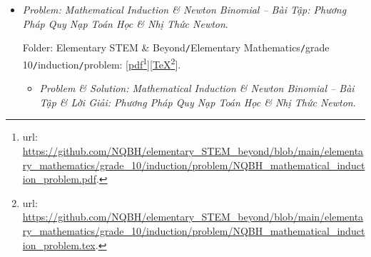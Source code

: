 \documentclass[12pt]{article}
\begin{document}
\begin{itemize}
	Folder: {\sf Elementary STEM \& Beyond{\tt/}Elementary Mathematics{\tt/}grade 10{\tt/}2D method of coordinate{\tt/}problem}: [\href{https://github.com/NQBH/elementary_STEM_beyond/blob/main/elementary_mathematics/grade_10/2D_method_coordinate/problem/NQBH_2D_method_coordinate_problem.pdf}{pdf}\footnote{{\sc url}: \url{https://github.com/NQBH/elementary_STEM_beyond/blob/main/elementary_mathematics/grade_10/2D_method_coordinate/problem/NQBH_2D_method_coordinate_problem.pdf}.}][\href{https://github.com/NQBH/elementary_STEM_beyond/blob/main/elementary_mathematics/grade_10/2D_method_coordinate/problem/NQBH_2D_method_coordinate_problem.tex}{\TeX}\footnote{{\sc url}: \url{https://github.com/NQBH/elementary_STEM_beyond/blob/main/elementary_mathematics/grade_10/2D_method_coordinate/problem/NQBH_2D_method_coordinate_problem.tex}.}].
	\begin{itemize}
		\item {\it Problem \& Solution: 2D Method of Cartesian Coordinates -- Bài Tập \& Lời Giải: Phương Pháp Tọa Độ Cartesian Trong Mặt Phẳng}.
		
		Folder: {\sf Elementary STEM \& Beyond{\tt/}Elementary Mathematics{\tt/}grade 10{\tt/}2D method of coordinate{\tt/}solution}: [\href{https://github.com/NQBH/elementary_STEM_beyond/blob/main/elementary_mathematics/grade_10/2D_method_coordinate/solution/NQBH_2D_method_coordinate_solution.pdf}{pdf}\footnote{{\sc url}: \url{https://github.com/NQBH/elementary_STEM_beyond/blob/main/elementary_mathematics/grade_10/2D_method_coordinate/solution/NQBH_2D_method_coordinate_solution.pdf}.}][\href{https://github.com/NQBH/elementary_STEM_beyond/blob/main/elementary_mathematics/grade_10/2D_method_coordinate/solution/NQBH_2D_method_coordinate_solution.tex}{\TeX}\footnote{{\sc url}: \url{https://github.com/NQBH/elementary_STEM_beyond/blob/main/elementary_mathematics/grade_10/2D_method_coordinate/solution/NQBH_2D_method_coordinate_solution.tex}.}].
	\end{itemize}
	\item {\it Problem: Mathematical Induction \& Newton Binomial -- Bài Tập: Phương Pháp Quy Nạp Toán Học \& Nhị Thức Newton}.
	
	Folder: {\sf Elementary STEM \& Beyond{\tt/}Elementary Mathematics{\tt/}grade 10{\tt/}induction{\tt/}problem}: [\href{https://github.com/NQBH/elementary_STEM_beyond/blob/main/elementary_mathematics/grade_10/induction/problem/NQBH_mathematical_induction_problem.pdf}{pdf}\footnote{{\sc url}: \url{https://github.com/NQBH/elementary_STEM_beyond/blob/main/elementary_mathematics/grade_10/induction/problem/NQBH_mathematical_induction_problem.pdf}.}][\href{https://github.com/NQBH/elementary_STEM_beyond/blob/main/elementary_mathematics/grade_10/induction/problem/NQBH_mathematical_induction_problem.tex}{\TeX}\footnote{{\sc url}: \url{https://github.com/NQBH/elementary_STEM_beyond/blob/main/elementary_mathematics/grade_10/induction/problem/NQBH_mathematical_induction_problem.tex}.}].
	\begin{itemize}
		\item {\it Problem \& Solution: Mathematical Induction \& Newton Binomial -- Bài Tập \& Lời Giải: Phương Pháp Quy Nạp Toán Học \& Nhị Thức Newton}.
		

\end{itemize}
\end{itemize}
\end{document}

